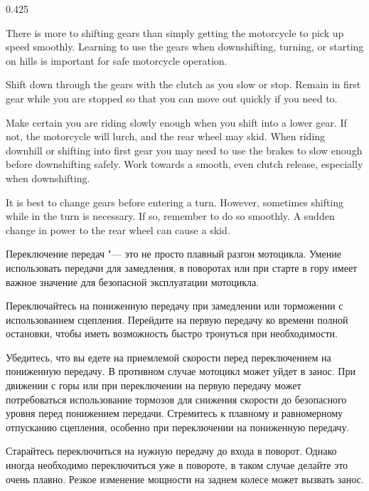 \begin{langblock}{0.425}
	\begin{eng}
	There is more to shifting gears than simply getting the motorcycle to pick up speed smoothly. Learning to use the gears when downshifting, turning, or starting on hills is important for safe motorcycle operation.
	
	Shift down through the gears with the clutch as you slow or stop. Remain in first gear while you are stopped so that you can move out quickly if you need to.
	
	Make certain you are riding slowly enough when you shift into a lower gear. If not, the motorcycle will lurch, and the rear wheel may skid. When riding downhill or shifting into first gear you may need to use the brakes to slow enough before downshifting safely. Work towards a smooth, even clutch release, especially when downshifting.
	
	It is best to change gears before entering a turn. However, sometimes shifting while in the turn is necessary. If so, remember to do so smoothly. A sudden change in power to the rear wheel can cause a skid.
	\end{eng}
	\begin{rus}
		Переключение передач "--- это не просто плавный разгон мотоцикла. Умение использовать передачи для замедления, в поворотах или при старте в гору имеет важное значение для безопасной эксплуатации мотоцикла.
		
		Переключайтесь на пониженную передачу при замедлении или торможении с использованием сцепления. Перейдите на первую передачу ко времени полной остановки, чтобы иметь возможность быстро тронуться при необходимости.
		
		Убедитесь, что вы едете на приемлемой скорости перед переключением на пониженную передачу. В противном случае мотоцикл может уйдет в занос. При движении с горы или при переключении на первую передачу может потребоваться использование тормозов для снижения скорости до безопасного уровня перед понижением передачи. Стремитесь к плавному и равномерному отпусканию сцепления, особенно при переключении на пониженную передачу.
		
		Старайтесь переключиться на нужную передачу до входа в поворот. Однако иногда необходимо переключиться уже в повороте, в таком случае  делайте это очень плавно. Резкое изменение мощности на заднем колесе может вызвать занос.
\end{rus}
\end{langblock}












